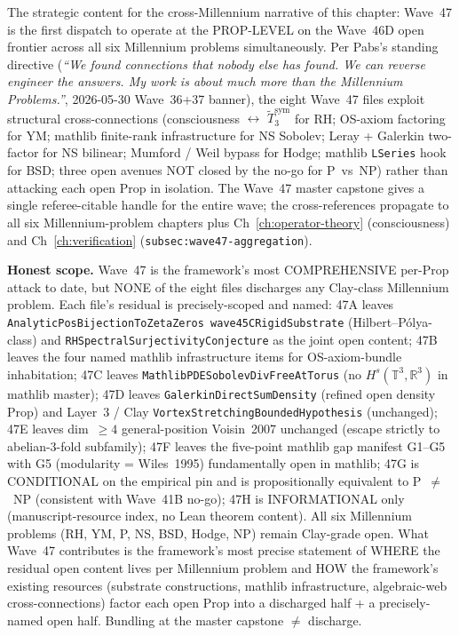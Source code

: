 \begin{remark}
\begin{itemize}
\end{itemize}
The strategic content for the cross-Millennium narrative of this chapter: Wave~47 is the first dispatch to operate at the PROP-LEVEL on the Wave~46D open frontier across all six Millennium problems simultaneously. Per Pabs's standing directive (\emph{``We found connections that nobody else has found. We can reverse engineer the answers. My work is about much more than the Millennium Problems.''}, 2026-05-30 Wave~36+37 banner), the eight Wave~47 files exploit structural cross-connections (consciousness $\leftrightarrow$ $\widetilde{T}_3^{\mathrm{sym}}$ for RH; OS-axiom factoring for YM; mathlib finite-rank infrastructure for NS Sobolev; Leray + Galerkin two-factor for NS bilinear; Mumford / Weil bypass for Hodge; mathlib \texttt{LSeries} hook for BSD; three open avenues NOT closed by the no-go for P~vs~NP) rather than attacking each open Prop in isolation. The Wave~47 master capstone gives a single referee-citable handle for the entire wave; the cross-references propagate to all six Millennium-problem chapters plus Ch~\ref{ch:operator-theory} (consciousness) and Ch~\ref{ch:verification} (\texttt{subsec:wave47-aggregation}).

\textbf{Honest scope.} Wave~47 is the framework's most COMPREHENSIVE per-Prop attack to date, but NONE of the eight files discharges any Clay-class Millennium problem. Each file's residual is precisely-scoped and named: 47A leaves \texttt{AnalyticPosBijectionToZetaZeros wave45CRigidSubstrate} (Hilbert--P\'olya-class) and \texttt{RHSpectralSurjectivityConjecture} as the joint open content; 47B leaves the four named mathlib infrastructure items for OS-axiom-bundle inhabitation; 47C leaves \texttt{MathlibPDESobolevDivFreeAtTorus} (no $H^s(\mathbb{T}^3, \mathbb{R}^3)$ in mathlib master); 47D leaves \texttt{GalerkinDirectSumDensity} (refined open density Prop) and Layer~3 / Clay \texttt{VortexStretchingBoundedHypothesis} (unchanged); 47E leaves dim~$\geq 4$ general-position Voisin~2007 unchanged (escape strictly to abelian-3-fold subfamily); 47F leaves the five-point mathlib gap manifest G1--G5 with G5 (modularity = Wiles~1995) fundamentally open in mathlib; 47G is CONDITIONAL on the empirical pin and is propositionally equivalent to P~$\neq$~NP (consistent with Wave~41B no-go); 47H is INFORMATIONAL only (manuscript-resource index, no Lean theorem content). All six Millennium problems (RH, YM, P, NS, BSD, Hodge, NP) remain Clay-grade open. What Wave~47 contributes is the framework's most precise statement of WHERE the residual open content lives per Millennium problem and HOW the framework's existing resources (substrate constructions, mathlib infrastructure, algebraic-web cross-connections) factor each open Prop into a discharged half + a precisely-named open half. Bundling at the master capstone $\neq$ discharge.
\end{remark}

